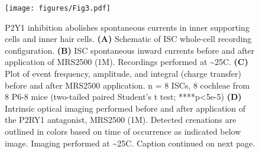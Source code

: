 \documentclass[9pt,lineno]{elife}
\begin{document}
\begin{figure}
\begin{fullwidth}
\begin{center}
\texttt{[image: figures/Fig3.pdf]}
\end{center}
\caption{P2Y1 inhibition abolishes spontaneous currents in inner supporting cells and inner hair cells.
\textbf{(A)} Schematic of ISC whole-cell recording configuration.
\textbf{(B)} ISC spontaneous inward currents before and after application of MRS2500 (1\textmu M). Recordings performed at \textasciitilde 25\textdegree C.
\textbf{(C)} Plot of event frequency, amplitude, and integral (charge transfer) before and after MRS2500 application. n = 8 ISCs, 8 cochleae from 8 P6-8 mice (two-tailed paired Student’s t test; ****p<5e-5)
\textbf{(D)} Intrinsic optical imaging performed before and after application of the P2RY1 antagonist, MRS2500 (1\textmu M). Detected crenations are outlined in colors based on time of occurrence as indicated below image. Imaging performed at \textasciitilde 25\textdegree C. Caption continued on next page.
}
\label{fig:f3}
\end{fullwidth}
\end{figure}
\addtocounter{figure}{-1}
\end{document}
